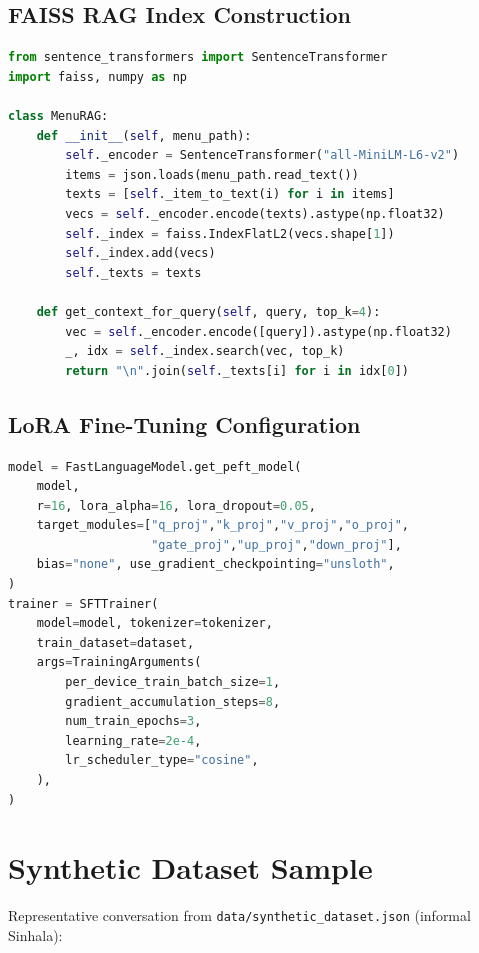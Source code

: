 \documentclass[12pt,a4paper]{report}
\begin{document}
\section{FAISS RAG Index Construction}
\begin{lstlisting}[language=Python, caption=RAG index construction at startup (app/rag.py)]
from sentence_transformers import SentenceTransformer
import faiss, numpy as np

class MenuRAG:
    def __init__(self, menu_path):
        self._encoder = SentenceTransformer("all-MiniLM-L6-v2")
        items = json.loads(menu_path.read_text())
        texts = [self._item_to_text(i) for i in items]
        vecs = self._encoder.encode(texts).astype(np.float32)
        self._index = faiss.IndexFlatL2(vecs.shape[1])
        self._index.add(vecs)
        self._texts = texts

    def get_context_for_query(self, query, top_k=4):
        vec = self._encoder.encode([query]).astype(np.float32)
        _, idx = self._index.search(vec, top_k)
        return "\n".join(self._texts[i] for i in idx[0])
\end{lstlisting}

\section{LoRA Fine-Tuning Configuration}
\begin{lstlisting}[language=Python, caption=LoRA adapter setup (train.py)]
model = FastLanguageModel.get_peft_model(
    model,
    r=16, lora_alpha=16, lora_dropout=0.05,
    target_modules=["q_proj","k_proj","v_proj","o_proj",
                    "gate_proj","up_proj","down_proj"],
    bias="none", use_gradient_checkpointing="unsloth",
)
trainer = SFTTrainer(
    model=model, tokenizer=tokenizer,
    train_dataset=dataset,
    args=TrainingArguments(
        per_device_train_batch_size=1,
        gradient_accumulation_steps=8,
        num_train_epochs=3,
        learning_rate=2e-4,
        lr_scheduler_type="cosine",
    ),
)
\end{lstlisting}

\chapter{Synthetic Dataset Sample}

Representative conversation from \texttt{data/synthetic\_dataset.json} (informal Sinhala):
\end{document}
